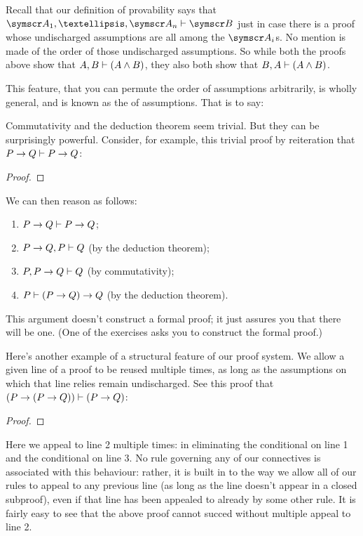 Recall that our definition of provability says that $\meta{A}_{1},…, \meta{A}_{n}\vdash \meta{B}$ just in case there is a proof whose undischarged assumptions are all among the $\meta{A}_{i}$s. No mention is made of the order of those undischarged assumptions. So while both the proofs above show that $A, B \vdash (A \wedge B)$, they also both show that $B, A \vdash (A \wedge B)$.

This feature, that you can permute the order of assumptions arbitrarily, is wholly general, and is known as the  of assumptions. That is to say: 

Commutativity and the deduction theorem seem trivial. But they can be surprisingly powerful. Consider, for example, this trivial proof by reiteration that $P \rightarrow Q \vdash P \rightarrow Q$: \begin{proof}
\end{proof} We can then reason as follows: \begin{enumerate}
	\item $P \rightarrow Q \vdash P \rightarrow Q$;
	\item $P \rightarrow Q, P \vdash Q$ (by the deduction theorem);
	\item $P, P \rightarrow Q \vdash Q$ (by commutativity);
	\item $P \vdash (P  \rightarrow Q) \rightarrow Q$ (by the deduction theorem).
\end{enumerate} This argument doesn't construct a formal proof; it just assures you that there will be one. (One of the exercises asks you to construct the formal proof.)

Here's another example of a structural feature of our proof system. We allow a given line of a proof to be reused multiple times, as long as the assumptions on which that line relies remain undischarged. See this proof that $(P \rightarrow(P \rightarrow Q)) \vdash (P\rightarrow Q)$: \begin{proof}
	\open
	\close
\end{proof} Here we appeal to line 2 multiple times: in eliminating the conditional on line 1 and the conditional on line 3. No rule governing any of our connectives is associated with this behaviour: rather, it is built in to the way we allow all of our rules to appeal to any previous line (as long as the line doesn't appear in a closed subproof), even if that line has been appealed to already by some other rule. It is fairly easy to see that the above proof cannot succed without multiple appeal to line 2.


